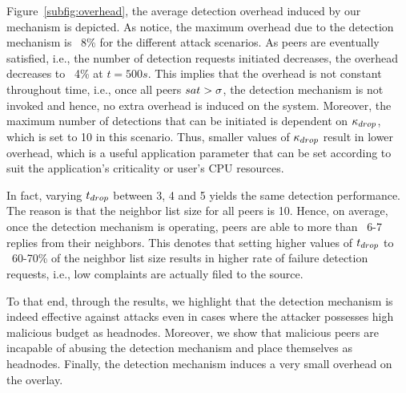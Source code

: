 Figure~\ref{subfig:overhead}, the average detection overhead induced by our mechanism is depicted.
As notice, the maximum overhead due to the detection mechanism is ~8\% for the different attack scenarios.
As peers are eventually satisfied, i.e., the number of detection requests initiated decreases, the overhead decreases to ~4\% at $t=500s$.
This implies that the overhead is not constant throughout time, i.e., once all peers $sat > \sigma$, the detection mechanism is not invoked and hence, no extra overhead is induced on the system.
Moreover, the maximum number of detections that can be initiated is dependent on $\kappa_{drop}$, which is set to 10 in this scenario.
Thus, smaller values of $\kappa_{drop}$ result in lower overhead, which is a useful application parameter that can be set according to suit the application's criticality or user's CPU resources.

In fact, varying $t_{drop}$ between 3, 4 and 5 yields the same detection performance.
The reason is that the neighbor list size for all peers is 10. 
Hence, on average, once the detection mechanism is operating, peers are able to more than ~6-7 replies from their neighbors.
This denotes that setting higher values of $t_{drop}$ to ~60-70\% of the neighbor list size results in higher rate of failure detection requests, i.e., low complaints are actually filed to the source. 

To that end, through the results, we highlight that the detection mechanism is indeed effective against \drop attacks even in cases where the attacker possesses high malicious budget as headnodes.
Moreover, we show that malicious peers are incapable of abusing the detection mechanism and place themselves as headnodes. Finally, the detection mechanism induces a very small overhead on the overlay.


